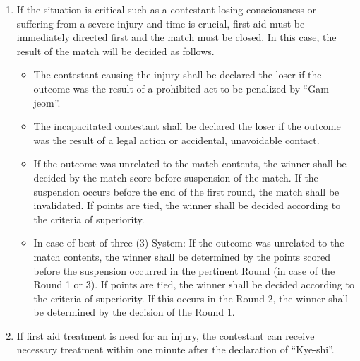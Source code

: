 \documentclass[
]{report}
\providecommand{\tightlist}{%
  \setlength{\itemsep}{0pt}\setlength{\parskip}{0pt}}
\renewcommand{\labelenumi}{\arabic{enumi}}
\begin{document}
\begin{enumerate}
\def\labelenumi{\roman{enumi}.}
\item
  If the situation is critical such as a contestant losing consciousness
  or suffering from a severe injury and time is crucial, first aid must
  be immediately directed first and the match must be closed. In this
  case, the result of the match will be decided as follows.

  \begin{itemize}
  \tightlist
  \item
    The contestant causing the injury shall be declared the loser if the
    outcome was the result of a prohibited act to be penalized by
    ``Gam-jeom''.
  \item
    The incapacitated contestant shall be declared the loser if the
    outcome was the result of a legal action or accidental, unavoidable
    contact.
  \item
    If the outcome was unrelated to the match contents, the winner shall
    be decided by the match score before suspension of the match. If the
    suspension occurs before the end of the first round, the match shall
    be invalidated. If points are tied, the winner shall be decided
    according to the criteria of superiority.
  \item
    In case of best of three (3) System: If the outcome was unrelated to
    the match contents, the winner shall be determined by the points
    scored before the suspension occurred in the pertinent Round (in
    case of the Round 1 or 3). If points are tied, the winner shall be
    decided according to the criteria of superiority. If this occurs in
    the Round 2, the winner shall be determined by the decision of the
    Round 1.
  \end{itemize}
\item
  If first aid treatment is need for an injury, the contestant can
  receive necessary treatment within one minute after the declaration of
  ``Kye-shi''.
\end{enumerate}
\end{document}
